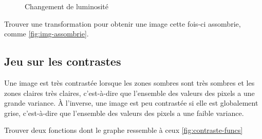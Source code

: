 \begin{figure}[h!]
    \begin{center}
    \end{center}
    \caption{Changement de luminosité}
\end{figure}

\ssques Trouver une transformation pour obtenir une image cette fois-ci assombrie, comme \autoref{fig:img-assombrie}.

\subsection*{Jeu sur les contrastes}

Une image est très contrastée lorsque les zones sombres sont très sombres et les zones claires très claires, c'est-à-dire que l'ensemble des valeurs des pixels a une grande variance. À l'inverse, une image est peu contrastée si elle est globalement grise, c'est-à-dire que l'ensemble des valeurs des pixels a une faible variance. 


\quessques Trouver deux fonctions dont le graphe ressemble à ceux \autoref{fig:contraste-funcs}

